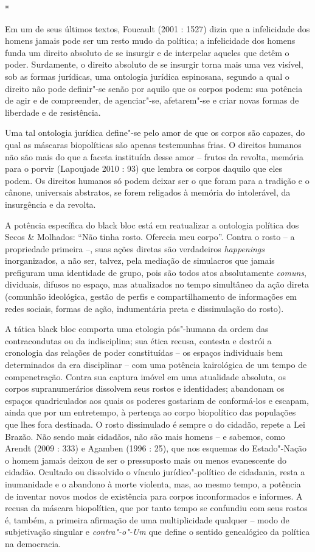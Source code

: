 *

Em um de seus últimos textos, Foucault (2001 : 1527) dizia que a
infelicidade dos homens jamais pode ser um resto mudo da política; a
infelicidade dos homens funda um direito absoluto de se insurgir e de
interpelar aqueles que detêm o poder. Surdamente, o direito absoluto de
se insurgir torna mais uma vez visível, sob as formas jurídicas, uma
ontologia jurídica espinosana, segundo a qual o direito não pode
definir"-se senão por aquilo que os corpos podem: sua potência de agir e
de compreender, de agenciar"-se, afetarem"-se e criar novas formas de
liberdade e de resistência.

Uma tal ontologia jurídica define"-se pelo amor de que os corpos são
capazes, do qual as máscaras biopolíticas são apenas testemunhas frias.
O direitos humanos não são mais do que a faceta instituída desse amor --
frutos da revolta, memória para o porvir (Lapoujade 2010 : 93) que
lembra os corpos daquilo que eles podem. Os direitos humanos só podem
deixar ser o que foram para a tradição e o cânone, universais abstratos,
se forem religados à memória do intolerável, da insurgência e da
revolta.

A potência específica do black bloc está em reatualizar a ontologia
política dos Secos \& Molhados: ``Não tinha rosto. Oferecia meu corpo''.
Contra o rosto -- a propriedade primeira --, suas ações diretas são
verdadeiros \emph{happenings} inorganizados, a não ser, talvez, pela
mediação de simulacros que jamais prefiguram uma identidade de grupo,
pois são todos atos absolutamente \emph{comuns}, dividuais, difusos no
espaço, mas atualizados no tempo simultâneo da ação direta (comunhão
ideológica, gestão de perfis e compartilhamento de informações em redes
sociais, formas de ação, indumentária preta e dissimulação do rosto).

A tática black bloc comporta uma etologia pós"-humana da ordem das
contracondutas ou da indisciplina; sua ética recusa, contesta e destrói
a cronologia das relações de poder constituídas -- os espaços
individuais bem determinados da era disciplinar -- com uma potência
kairológica de um tempo de compenetração. Contra sua captura imóvel em
uma atualidade absoluta, os corpos supranumerários dissolvem seus rostos
e identidades; abandonam os espaços quadriculados aos quais os poderes
gostariam de conformá-los e escapam, ainda que por um entretempo, à
pertença ao corpo biopolítico das populações que lhes fora destinada. O
rosto dissimulado é sempre o do cidadão, repete a Lei Brazão. Não sendo
mais cidadãos, não são mais homens -- e sabemos, como Arendt (2009 :
333) e Agamben (1996 : 25), que nos esquemas do Estado"-Nação o homem
jamais deixou de ser o pressuposto mais ou menos evanescente do cidadão.
Ocultado ou dissolvido o vínculo jurídico"-político de cidadania, resta a
inumanidade e o abandono à morte violenta, mas, ao mesmo tempo, a
potência de inventar novos modos de existência para corpos inconformados
e informes. A recusa da máscara biopolítica, que por tanto tempo se
confundiu com seus rostos é, também, a primeira afirmação de uma
multiplicidade qualquer -- modo de subjetivação singular e
\emph{contra"-o"-Um} que define o sentido genealógico da política na
democracia.

